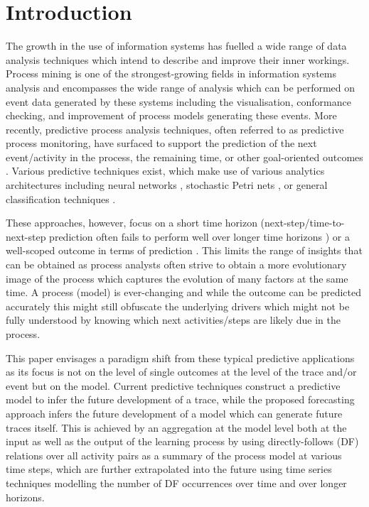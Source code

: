 \section{Introduction}\label{sec:introduction}

The growth in the use of information systems has fuelled a wide range of data analysis techniques which intend to describe and improve their inner workings.
Process mining \cite{van2016data} is one of the strongest-growing fields in information systems analysis and encompasses the wide range of analysis which can be performed on event data generated by these systems including the visualisation, conformance checking, and improvement of process models generating these events.
More recently, predictive process analysis techniques, often referred to as predictive process monitoring, have surfaced to support the prediction of the next event/activity in the process, the remaining time, or other goal-oriented outcomes \cite{DBLP:conf/bpm/Francescomarino18}.
Various predictive techniques exist, which make use of various analytics architectures including neural networks \cite{DBLP:conf/caise/TaxVRD17}, stochastic Petri nets \cite{DBLP:conf/icsoc/Rogge-SoltiW13}, or general classification techniques \cite{DBLP:journals/tkdd/TeinemaaDRM19}.

These approaches, however, focus on a short time horizon (next-step/time-to-next-step prediction often fails to perform well over longer time horizons \cite{park2020predicting}) or a well-scoped outcome in terms of prediction \cite{DBLP:journals/tkdd/TeinemaaDRM19}.
This limits the range of insights that can be obtained as process analysts often strive to obtain a more evolutionary image of the process \cite{DBLP:conf/bpm/PollPRRR18} which captures the evolution of many factors at the same time. 
A process (model) is ever-changing and while the outcome can be predicted accurately this might still obfuscate the underlying drivers which might not be fully understood by knowing which next activities/steps are likely due in the process.

This paper envisages a paradigm shift from these typical predictive applications as its focus is not on the level of single outcomes at the level of the trace and/or event but on the model.
Current predictive techniques construct a predictive model to infer the future development of a trace, while the proposed forecasting approach infers the future development of a model which can generate future traces itself.
This is achieved by an aggregation at the model level both at the input as well as the output of the learning process by using directly-follows (DF) relations over all activity pairs as a summary of the process model at various time steps, which are further extrapolated into the future using time series techniques modelling the number of DF occurrences over time and over longer horizons.

